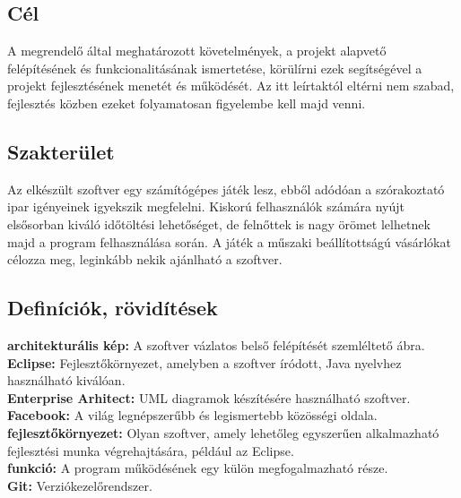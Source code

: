 
\subsection{Cél}
A megrendelő által meghatározott követelmények, a projekt alapvető felépítésének és funkcionalitásának ismertetése, körülírni ezek segítségével a projekt fejlesztésének menetét és működését. Az itt leírtaktól eltérni nem szabad, fejlesztés közben ezeket folyamatosan figyelembe kell majd venni.

\subsection{Szakterület}

Az elkészült szoftver egy számítógépes játék lesz, ebből adódóan a szórakoztató ipar igényeinek igyekszik megfelelni. Kiskorú felhasználók számára nyújt elsősorban kiváló időtöltési lehetőséget, de felnőttek is nagy örömet lelhetnek majd a program felhasználása során. A játék a műszaki beállítottságú vásárlókat célozza meg, leginkább nekik ajánlható a szoftver.

\subsection{Definíciók, rövidítések}


\noindent \textbf{architekturális kép:} A szoftver vázlatos belső felépítését szemléltető ábra.\\

\noindent\textbf{Eclipse:} Fejlesztőkörnyezet, amelyben a szoftver íródott, Java nyelvhez használható kiválóan.\\

\noindent\textbf{Enterprise Arhitect:} UML diagramok készítésére használható szoftver.\\

\noindent\textbf{Facebook:} A világ legnépszerűbb és legismertebb közösségi oldala.\\

\noindent\textbf{fejlesztőkörnyezet:} Olyan szoftver, amely lehetőleg egyszerűen alkalmazható fejlesztési munka végrehajtására, például az Eclipse.\\

\noindent\textbf{funkció:} A program működésének egy külön megfogalmazható része.\\

\noindent\textbf{Git:} Verziókezelőrendszer.\\

